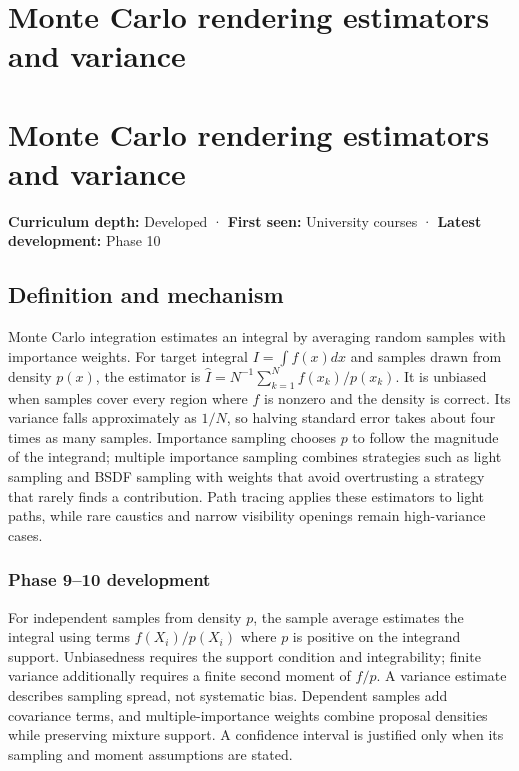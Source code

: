 \hypertarget{appendix-031e02bf28af}{}
\section*{Monte Carlo rendering estimators and variance}
\section{Monte Carlo rendering estimators and variance}\label{monte-carlo-rendering-estimators-and-variance}

\textbf{Curriculum depth:} Developed · \textbf{First seen:} University courses · \textbf{Latest development:} Phase 10

\subsection{Definition and mechanism}\label{definition-and-mechanism}

Monte Carlo integration estimates an integral by averaging random samples with importance weights. For target integral \(I=\int f(x)dx\) and samples drawn from density \(p(x)\), the estimator is \(\hat I=N^{-1}\sum_{k=1}^N f(x_k)/p(x_k)\). It is unbiased when samples cover every region where \(f\) is nonzero and the density is correct. Its variance falls approximately as \(1/N\), so halving standard error takes about four times as many samples. Importance sampling chooses \(p\) to follow the magnitude of the integrand; multiple importance sampling combines strategies such as light sampling and BSDF sampling with weights that avoid overtrusting a strategy that rarely finds a contribution. Path tracing applies these estimators to light paths, while rare caustics and narrow visibility openings remain high-variance cases.

\subsubsection{Phase 9--10 development}\label{phase-910-development}

For independent samples from density \(p\), the sample average estimates the integral using terms \(f(X_i)/p(X_i)\) where \(p\) is positive on the integrand support. Unbiasedness requires the support condition and integrability; finite variance additionally requires a finite second moment of \(f/p\). A variance estimate describes sampling spread, not systematic bias. Dependent samples add covariance terms, and multiple-importance weights combine proposal densities while preserving mixture support. A confidence interval is justified only when its sampling and moment assumptions are stated.

